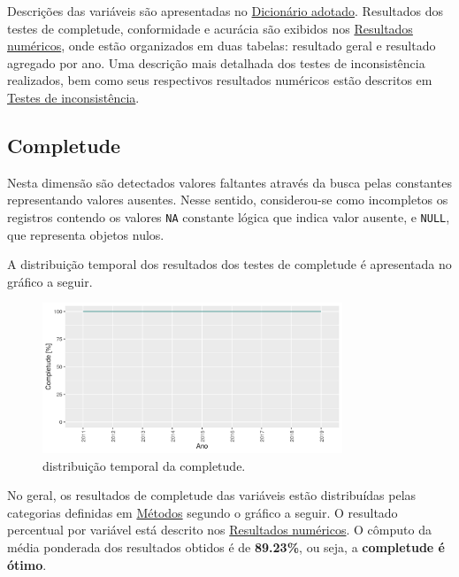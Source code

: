 \documentclass[
  12,
]{proadi}
\begin{document}
Descrições das variáveis são apresentadas no
\protect\hyperlink{dicionuxe1rio-adotado}{Dicionário adotado}.
Resultados dos testes de completude, conformidade e acurácia são
exibidos nos \protect\hyperlink{resultados-numuxe9ricos}{Resultados
numéricos}, onde estão organizados em duas tabelas: resultado geral e
resultado agregado por ano. Uma descrição mais detalhada dos testes de
inconsistência realizados, bem como seus respectivos resultados
numéricos estão descritos em
\protect\hyperlink{testes-de-inconsistuxeancia}{Testes de
inconsistência}.

\hypertarget{completude}{%
\subsection{Completude}\label{completude}}

Nesta dimensão são detectados valores faltantes através da busca pelas
constantes representando valores ausentes. Nesse sentido, considerou-se
como incompletos os registros contendo os valores \texttt{NA} constante
lógica que indica valor ausente, e \texttt{NULL}, que representa objetos
nulos.

A distribuição temporal dos resultados dos testes de completude é
apresentada no gráfico a seguir.

\begin{figure}
\centering
\includegraphics[width=0.8\textwidth,height=\textheight]{imagens/comp-anual.png}
\caption{distribuição temporal da completude.}
\end{figure}

No geral, os resultados de completude das variáveis estão distribuídas
pelas categorias definidas em \protect\hyperlink{muxe9todos}{Métodos}
segundo o gráfico a seguir. O resultado percentual por variável está
descrito nos \protect\hyperlink{resultados-numuxe9ricos}{Resultados
numéricos}. O cômputo da média ponderada dos resultados obtidos é de
\textbf{89.23\%}, ou seja, a \textbf{completude é ótimo}.
\end{document}
